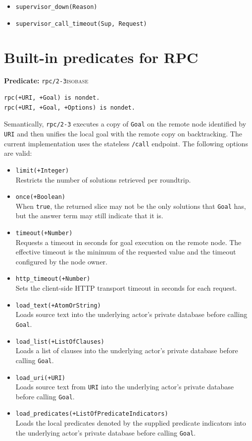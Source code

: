\begin{itemize}
\item \texttt{supervisor\_down(Reason)}
\item \texttt{supervisor\_call\_timeout(Sup, Request)}
\end{itemize}

\section{Built-in predicates for RPC}\label{sec:synchronous-predicate-api}

\noindent \textbf{Predicate:} \texttt{rpc/2-3}\hfill\textsc{isobase}

\begin{verbatim}
rpc(+URI, +Goal) is nondet.
rpc(+URI, +Goal, +Options) is nondet.
\end{verbatim}

\noindent Semantically, \texttt{rpc/2-3} executes a copy of \texttt{Goal} on
the remote node identified by \texttt{URI} and then unifies the local goal
with the remote copy on backtracking. The current implementation uses the
stateless \texttt{/call} endpoint. The following options are valid:

\begin{itemize}
\item
  \texttt{limit(+Integer)}\\
  Restricts the number of solutions retrieved per roundtrip.
\item
  \texttt{once(+Boolean)}\\
  When \texttt{true}, the returned slice may not be the only solutions that
  \texttt{Goal} has, but the answer term may still indicate that it is.
\item
  \texttt{timeout(+Number)}\\
  Requests a timeout in seconds for goal execution on the remote node. The
  effective timeout is the minimum of the requested value and the timeout
  configured by the node owner.
\item
  \texttt{http\_timeout(+Number)}\\
  Sets the client-side HTTP transport timeout in seconds for each request.
\item
  \texttt{load\_text(+AtomOrString)}\\
  Loads source text into the underlying actor's private database before calling
  \texttt{Goal}.
\item
  \texttt{load\_list(+ListOfClauses)}\\
  Loads a list of clauses into the underlying actor's private database before
  calling \texttt{Goal}.
\item
  \texttt{load\_uri(+URI)}\\
  Loads source text from \texttt{URI} into the underlying actor's private
  database before calling \texttt{Goal}.
\item
  \texttt{load\_predicates(+ListOfPredicateIndicators)}\\
  Loads the local predicates denoted by the supplied predicate indicators into
  the underlying actor's private database before calling \texttt{Goal}.
\end{itemize}

